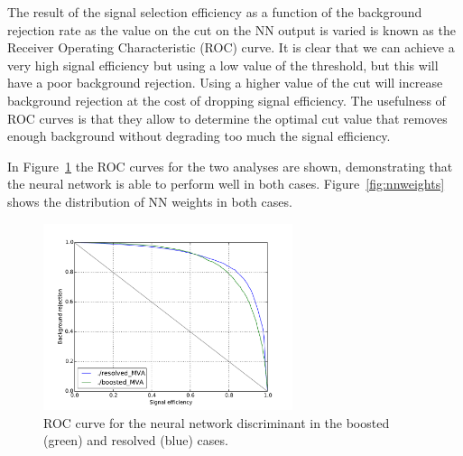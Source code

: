 The result of the signal selection efficiency as a function of the
background rejection rate as the value on the cut on the NN output
is varied is known as the Receiver Operating Characteristic (ROC)
curve.
%
It is clear that we can achieve a very high signal efficiency but using
a low value of the threshold, but this will have a poor background
rejection.
%
Using a higher value of the cut will increase background rejection at the
cost of dropping signal efficiency.
%
The usefulness of ROC curves is that they allow to determine the
optimal cut value that removes enough background without degrading too much the signal efficiency.

In Figure~\ref{fig:exampleroc} the ROC curves for the two analyses are shown, demonstrating that the neural network is able to
perform well in both cases. Figure~\ref{fig:nnweights} shows the distribution of NN weights in both cases.

\begin{figure}[t]
\begin{center}
\includegraphics[width=0.65\textwidth]{plots/example_roc.pdf}
\caption{\small ROC curve for the neural network discriminant in the boosted (green) and resolved (blue) cases.}
\label{fig:exampleroc}
\end{center}
\end{figure}

